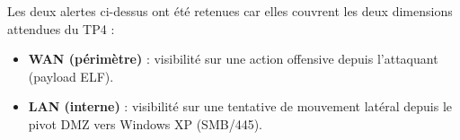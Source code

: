 \documentclass[12pt,a4paper,openany]{report}
\begin{document}
\begin{tcolorbox}[colback=secondary!5!white, colframe=secondary, title=\textbf{Note méthodologique}]
Les deux alertes ci-dessus ont été retenues car elles couvrent les deux dimensions attendues du TP4 :
\begin{itemize}
\item \textbf{WAN (périmètre)} : visibilité sur une action offensive depuis l'attaquant (payload ELF).
\item \textbf{LAN (interne)} : visibilité sur une tentative de mouvement latéral depuis le pivot DMZ vers Windows XP (SMB/445).
\end{itemize}
\end{tcolorbox}

\end{document}
